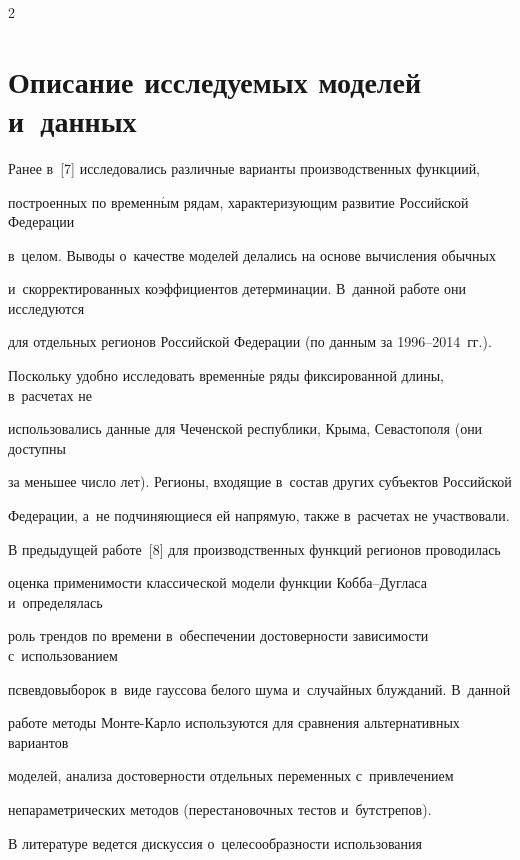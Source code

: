 \begin{multicols}{2}
{}





\section{Описание исследуемых моделей и~данных}





  Ранее в~[7] исследовались различные варианты производственных функциий, 


построенных по временн$\acute{\mbox{ы}}$м рядам, характеризующим развитие Российской Федерации 


в~целом. Выводы о~качестве моделей делались на основе вычисления обычных 


и~скорректированных коэффициентов детерминации. В~данной работе они исследуются 


для отдельных регионов Российской Федерации (по данным за 1996--2014~гг.). 


Поскольку удобно исследовать временн$\acute{\mbox{ы}}$е ряды фиксированной длины, в~расчетах не 


использовались данные для Чеченской республики, Крыма, Севастополя (они доступны 


за меньшее число лет). Регионы, входящие в~состав других субъектов Российской 


Федерации, а~не подчиняющиеся ей напрямую, также в~расчетах не участвовали.


  


  В предыдущей работе~[8] для производственных функций регионов проводилась 


оценка применимости классической модели функции Коб\-ба--Дуг\-ла\-са и~определялась 


роль трендов по времени в~обеспечении достоверности зависимости с~использованием 


псвевдовыборок в~виде гауссова белого шума и~случайных блужданий. В~данной 


работе методы Монте-Карло используются для сравнения альтернативных вариантов 


моделей, анализа достоверности отдельных переменных с~привлечением 


непараметрических методов (перестановочных тес\-тов и~бутстрепов).


  


  В литературе ведется дискуссия о~целесообразности использования 



\end{multicols}
